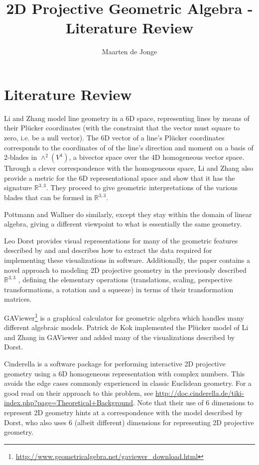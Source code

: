 \documentclass[a4paper, 10pt]{article}
\author{Maarten de Jonge}
\title{2D Projective Geometric Algebra - Literature Review}
\begin{document}
\newcommand{\rp}{$\mathbb{R}^{3,3}$ }

\maketitle

\section{Literature Review}
Li and Zhang\cite{hangbo2011} model line geometry in a 6D space, representing
lines by means of their Pl\"{u}cker coordinates (with the constraint that the
vector must square to zero, i.e. be a null vector).  The 6D vector of a line's
Pl\"{u}cker coordinates corresponds to the coordinates of of the line's
direction and moment on a basis of 2-blades in $\wedge^2(V^4)$, a bivector space
over the 4D homogeneous vector space. Through a clever correspondence with the
homogeneous space, Li and Zhang also provide a metric for the 6D
representational space and show that it has the signature $\mathbb{R}^{3, 3}$. They
proceed to give geometric interpretations of the various blades that can be
formed in $\mathbb{R}^{3, 3}$.

Pottmann and Wallner\cite{pottmann2001computational} do similarly, except they
stay within the domain of linear algebra, giving a different viewpoint to what is
essentially the same geometry.

Leo Dorst\cite{dorst2013versors} provides visual representations for many of the
geometric features described by \cite{hangbo2011} and
\cite{pottmann2001computational} and describes how to extract the data required
for implementing these visualizations in software. Additionally, the paper
contains a novel approach to modeling 2D projective geometry in the previously
described \rp, defining the elementary operations (translations, scaling,
perspective transformations, a rotation and a squeeze) in terms of their
transformation matrices.

GAViewer\footnote{\url{http://www.geometricalgebra.net/gaviewer\_download.html}}
is a graphical calculator for geometric algebra which handles many different
algebraic models. Patrick de Kok\cite{dekok2012} implemented the
Pl\"{u}cker model of Li and Zhang in GAViewer and added many of the
visualizations described by Dorst.

Cinderella\cite{richter1999interactive} is a software package for performing
interactive 2D projective geometry using a 6D homogeneous representation with
complex numbers. This avoids the edge cases commonly experienced in classic
Euclidean geometry. For a good read on their approach to this problem, see
\url{http://doc.cinderella.de/tiki-index.php?page=Theoretical+Background}.
Note that their use of 6 dimensions to represent 2D geometry hints at a
correspondence with the model described by Dorst, who also uses 6 (albeit
different) dimensions for representing 2D projective geometry.



\end{document}
